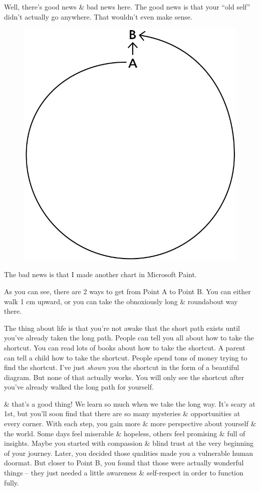 \documentclass{article}
\numberwithin{equation}{section}
\begin{document}
Well, there's good news \& bad news here. The good news is that your ``old self'' didn't actually go anywhere. That wouldn't even make sense.
\begin{figure}[H]
	\centering
	\includegraphics[scale=.1]{1}
\end{figure}
The bad news is that I made another chart in Microsoft Paint.

As you can see, there are 2 ways to get from Point A to Point B. You can either walk 1 cm upward, or you can take the obnoxiously long \& roundabout way there.

The thing about life is that you're not awake that the short path exists until you've already taken the long path. People can tell you all about how to take the shortcut. You can read lots of books about how to take the shortcut. A parent can tell a child how to take the shortcut. People spend tons of money trying to find the shortcut. I've just \textit{shown} you the shortcut in the form of a beautiful diagram. But none of that actually works. You will only see the shortcut after you've already walked the long path for yourself.

\& that's a good thing! We learn so much when we take the long way. It's scary at 1st, but you'll soon find that there are so many mysteries \& opportunities at every corner. With each step, you gain more \& more perspective about yourself \& the world. Some days feel miserable \& hopeless, others feel promising \& full of insights. Maybe you started with compassion \& blind trust at the very beginning of your journey. Later, you decided those qualities made you a vulnerable human doormat. But closer to Point B, you found that those were actually wonderful things -- they just needed a little awareness \& self-respect in order to function fully.
\end{document}

